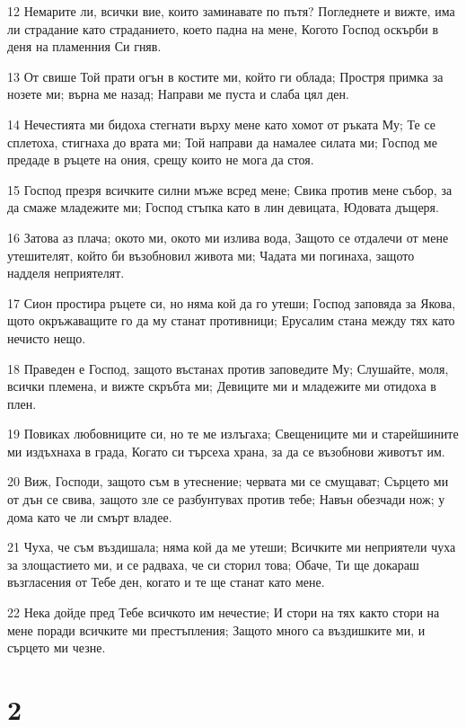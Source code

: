 \par 12 Немарите ли, всички вие, които заминавате по пътя? Погледнете и вижте, има ли страдание като страданието, което падна на мене, Когото Господ оскърби в деня на пламенния Си гняв.
\par 13 От свише Той прати огън в костите ми, който ги облада; Простря примка за нозете ми; върна ме назад; Направи ме пуста и слаба цял ден.
\par 14 Нечестията ми бидоха стегнати върху мене като хомот от ръката Му; Те се сплетоха, стигнаха до врата ми; Той направи да намалее силата ми; Господ ме предаде в ръцете на ония, срещу които не мога да стоя.
\par 15 Господ презря всичките силни мъже всред мене; Свика против мене събор, за да смаже младежите ми; Господ стъпка като в лин девицата, Юдовата дъщеря.
\par 16 Затова аз плача; окото ми, окото ми излива вода, Защото се отдалечи от мене утешителят, който би възобновил живота ми; Чадата ми погинаха, защото надделя неприятелят.
\par 17 Сион простира ръцете си, но няма кой да го утеши; Господ заповяда за Якова, щото окръжаващите го да му станат противници; Ерусалим стана между тях като нечисто нещо.
\par 18 Праведен е Господ, защото въстанах против заповедите Му; Слушайте, моля, всички племена, и вижте скръбта ми; Девиците ми и младежите ми отидоха в плен.
\par 19 Повиках любовниците си, но те ме излъгаха; Свещениците ми и старейшините ми издъхнаха в града, Когато си търсеха храна, за да се възобнови животът им.
\par 20 Виж, Господи, защото съм в утеснение; червата ми се смущават; Сърцето ми от дън се свива, защото зле се разбунтувах против тебе; Навън обезчади нож; у дома като че ли смърт владее.
\par 21 Чуха, че съм въздишала; няма кой да ме утеши; Всичките ми неприятели чуха за злощастието ми, и се радваха, че си сторил това; Обаче, Ти ще докараш възгласения от Тебе ден, когато и те ще станат като мене.
\par 22 Нека дойде пред Тебе всичкото им нечестие; И стори на тях както стори на мене поради всичките ми престъпления; Защото много са въздишките ми, и сърцето ми чезне.

\chapter{2}

